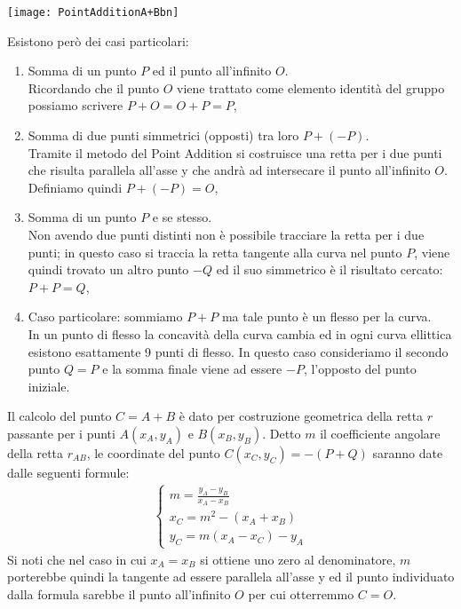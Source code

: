 \documentclass[a4paper,12pt]{tesiinfo}
\begin{document}
\begin{center}
\texttt{[image: PointAdditionA+Bbn]}
\end{center}
Esistono per\`o dei casi particolari:
\begin{enumerate}
    \item Somma di un punto $P$ ed il punto all'infinito $O$. 
    \\
    Ricordando che il punto $O$ viene trattato come elemento identit\`a del gruppo possiamo scrivere $P+O = O+P = P$,
    \item Somma di due punti simmetrici (opposti) tra loro $P + (-P)$. 
    \\
    Tramite il metodo del Point Addition si costruisce una retta per i due punti che risulta parallela all'asse y che andr\`a ad intersecare il punto all'infinito $O$. Definiamo quindi $P + (-P) = O$,
    \item Somma di un punto $P$ e se stesso. 
    \\
    Non avendo due punti distinti non \`e possibile tracciare la retta per i due punti; in questo caso si traccia la retta tangente alla curva nel punto $P$, viene quindi trovato un altro punto $-Q$ ed il suo simmetrico \`e il risultato cercato: $P + P = Q$,
    \item Caso particolare: sommiamo $P+P$ ma tale punto \`e un flesso per la curva. 
    \\
    In un punto di flesso la concavit\`a della curva cambia ed in ogni curva ellittica esistono esattamente 9 punti di flesso. In questo caso consideriamo il secondo punto $Q =P$ e la somma finale viene ad essere $-P$, l'opposto del punto iniziale.
\end{enumerate}
Il calcolo del punto $C = A + B$ \`e dato per costruzione geometrica della retta $r$ passante per i punti $A(x_A, y_A)$ e $B(x_B, y_B)$. Detto $m$ il coefficiente angolare della retta $r_{AB}$, le coordinate del punto $C(x_C, y_C) = -(P+Q)$ saranno date dalle seguenti formule:
\begin{align*}
\begin{cases}
m = \frac{y_A - y_B}{x_A - x_B}\\
x_C = m^2 - (x_A + x_B)\\
y_C = m(x_A - x_C)-y_A
\end{cases}
\end{align*}
Si noti che nel caso in cui $x_A = x_B$ si ottiene uno zero al denominatore, $m$ porterebbe quindi la tangente ad essere parallela all'asse y ed il punto individuato dalla formula sarebbe il punto all'infinito $O$ per cui otterremmo $C = O$.
\end{document}
